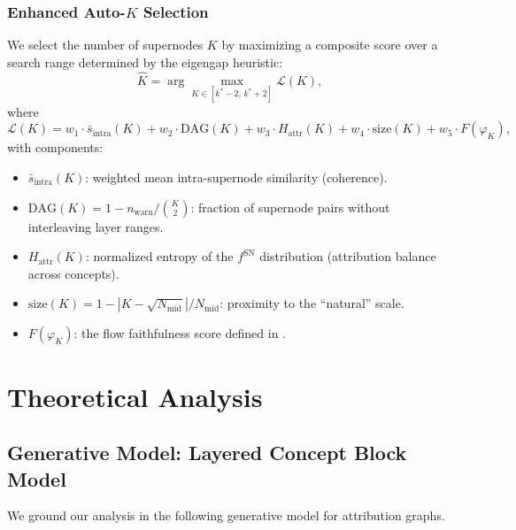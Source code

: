 \documentclass[11pt]{article}
\newcommand{\cL}{\mathcal{L}}
\newcommand{\1}{\mathbbm{1}}
\begin{document}
\subsubsection{Enhanced Auto-$K$ Selection}
\label{sec:auto-k}

We select the number of supernodes $K$ by maximizing a composite score over a search range determined by the eigengap heuristic:
\begin{equation}
  \hat{K} = \arg\max_{K \in [k^*-2,\, k^*+2]} \cL(K),
  \label{eq:auto-k}
\end{equation}
where
\begin{equation}
  \cL(K) = w_1 \cdot \bar{s}_{\mathrm{intra}}(K) + w_2 \cdot \mathrm{DAG}(K) + w_3 \cdot H_{\mathrm{attr}}(K) + w_4 \cdot \mathrm{size}(K) + w_5 \cdot F(\varphi_K),
  \label{eq:score}
\end{equation}
with components:
\begin{itemize}[leftmargin=2em]
  \item $\bar{s}_{\mathrm{intra}}(K)$: weighted mean intra-supernode similarity (coherence).
  \item $\mathrm{DAG}(K) = 1 - n_{\mathrm{warn}} / \binom{K}{2}$: fraction of supernode pairs without interleaving layer ranges.
  \item $H_{\mathrm{attr}}(K)$: normalized entropy of the $f^{\mathrm{SN}}$ distribution (attribution balance across concepts).
  \item $\mathrm{size}(K) = 1 - |K - \sqrt{N_{\mathrm{mid}}}| / N_{\mathrm{mid}}$: proximity to the ``natural'' scale.
  \item $F(\varphi_K)$: the flow faithfulness score defined in .
\end{itemize}

\section{Theoretical Analysis}
\label{sec:theory}

\subsection{Generative Model: Layered Concept Block Model}
\label{sec:model}

We ground our analysis in the following generative model for attribution graphs.
\end{document}
